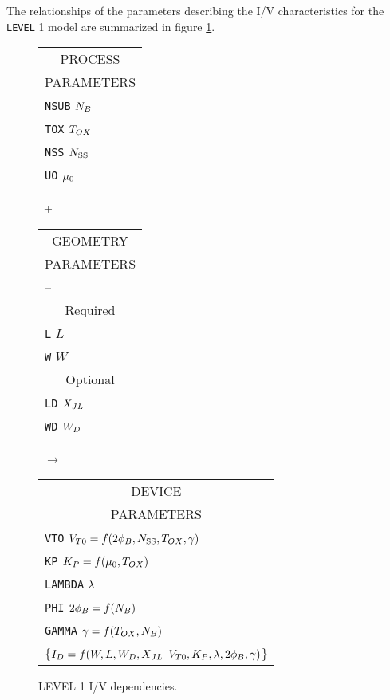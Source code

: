 {The relationships of the parameters describing the I/V
characteristics for the {\tt LEVEL} 1 model are summarized in figure
\ref{mlevel1i/v}.\\[0.1in]
\begin{figure}
\begin{tabular}[t]{|p{1in}|}
\hline
\multicolumn{1}{|c|}{PROCESS} \\
\multicolumn{1}{|c|}{PARAMETERS} \\
\hline
\hline
{\tt NSUB} \hfill $N_B$\\
{\tt TOX} \hfill $T_{OX}$\\
{\tt NSS} \hfill $N_{\mbox{\scriptsize SS}}$\\
{\tt UO} \hfill $\mu_0$\\
\hline
\end{tabular}
\hfill
\parbox{0.1in}{\ \vspace*{0.2in}\newline +}
\hfill
\begin{tabular}[t]{|p{1in}|}
\hline
\multicolumn{1}{|c|}{GEOMETRY} \\
\multicolumn{1}{|c|}{PARAMETERS} \\
\hline
\hspace*{\fill} -- \hspace*{\fill} \\
\hline
\hline
\multicolumn{1}{|c|}{Required} \\
\hline
{\tt L} \hfill $L$\\
{\tt W} \hfill $W$ \\
\hline
\hline
\multicolumn{1}{|c|}{Optional} \\
\hline
{\tt LD} \hfill $X_{JL}$\\
{\tt WD} \hfill $W_D$ \\
\hline
\end{tabular}
\hfill
\parbox{0.1in}{\ \vspace*{0.2in}\newline $\rightarrow$}
\hfill
\begin{tabular}[t]{|p{1.8in}|}
\hline
\multicolumn{1}{|c|}{DEVICE} \\
\multicolumn{1}{|c|}{PARAMETERS} \\
\hline
{\tt VTO} \newline \hspace*{\fill} $V_{T0} = f(2\phi_B, N_{\mbox{\scriptsize SS}}, T_{OX}, \gamma)$\\
{\tt KP} \hfill $K_P = f(\mu_0, T_{OX})$\\
{\tt LAMBDA} \hfill $\lambda$\\
{\tt PHI} \hfill $2\phi_B = f(N_B)$\\
{\tt GAMMA} \hfill $\gamma = f(T_{OX}, N_B)$\\
\{$I_{D} = f(W, L, W_D, X_{JL}$\hspace*{\fill}\newline\hspace*{\fill}
$V_{T0}, K_P, \lambda, 2\phi_B, \gamma)$\}\\
\hline
\end{tabular}
\caption{LEVEL 1 I/V dependencies. \label{mlevel1i/v}}
\end{figure}
}
